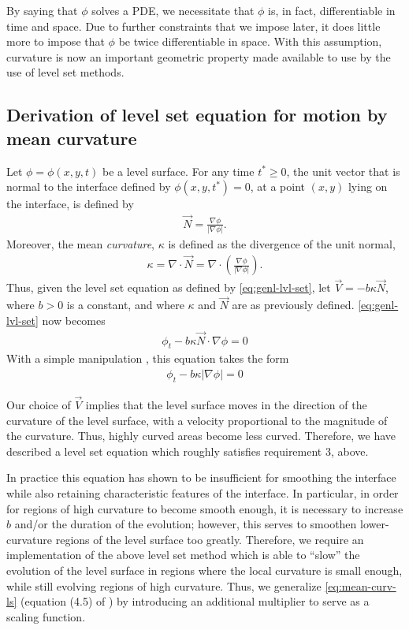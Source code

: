 \documentclass{article}
\begin{document}
By saying that $\phi$ solves a PDE, we necessitate that $\phi$ is,
in fact, differentiable in time and space. Due to further
constraints that we impose later, it does little more to impose
that $\phi$ be twice differentiable in space. With this
assumption, curvature is now an important geometric property made
available to use by the use of level set methods. 

\subsection{Derivation of level set equation for motion by mean
  curvature}
\label{sec:derivation-level-set}

Let $\phi = \phi(x,y,t)$ be a level surface. For any time $t^*\geq
0$, the unit vector that is normal to the interface defined by
$\phi(x,y, t^*) = 0$, at a point $(x,y)$ lying on the interface,
is defined by
\begin{align}
\label{eq:unit-normal}
  \vec{N} = \frac{\nabla \phi}{\left|\nabla \phi\right|}.
\end{align}
Moreover, the mean \emph{curvature}, $\kappa$ is defined as the
divergence of the unit normal,
\begin{align}
\label{eq:mean-curv}
  \kappa = \nabla\cdot \vec{N} = \nabla\cdot \left(\frac{\nabla
      \phi}{\left|\nabla\phi\right|}\right).
\end{align}
Thus, given the level set equation as defined by
\autoref{eq:genl-lvl-set}, let $\vec{V} = -b\kappa \vec{N}$, where
$b>0$ is a constant, and where $\kappa$ and $\vec{N}$ are as
previously defined. \autoref{eq:genl-lvl-set} now becomes
\begin{align*}
  \phi_t -b\kappa\vec{N}\cdot\nabla\phi = 0
\end{align*}
With a simple manipulation \cite{osher2003}, this equation takes
the form 
\begin{align}
  \label{eq:mean-curv-ls}
  \phi_t - b \kappa \left|\nabla\phi\right| = 0
\end{align}

Our choice of $\vec{V}$ implies that the level surface moves in
the direction of the curvature of the level surface, with a
velocity proportional to the magnitude of the curvature. Thus,
highly curved areas become less curved. Therefore, we have
described a level set equation which roughly satisfies
requirement 3, above. 

In practice this equation has shown to be insufficient for
smoothing the interface while also retaining characteristic
features of the interface. In particular, in order for regions of
high curvature to become smooth enough, it is necessary to
increase $b$ and/or the duration of the evolution; however, this
serves to smoothen lower-curvature regions of the level surface
too greatly. Therefore, we require an implementation of the above
level set method which is able to ``slow'' the evolution of the
level surface in regions where the local curvature is small
enough, while still evolving regions of high curvature. Thus, we
generalize \autoref{eq:mean-curv-ls} (equation (4.5) of
\cite{osher2003}) by introducing an additional multiplier to serve
as a scaling function.
\end{document}
